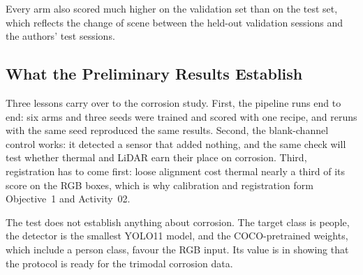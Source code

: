 Every arm also scored much higher on the validation set than on the test set,
which reflects the change of scene between the held-out validation sessions and
the authors' test sessions.

\subsection{What the Preliminary Results Establish}

Three lessons carry over to the corrosion study. First, the pipeline runs end to
end: six arms and three seeds were trained and scored with one recipe, and
reruns with the same seed reproduced the same results. Second, the blank-channel
control works: it detected a sensor that added nothing, and the same check will
test whether thermal and LiDAR earn their place on corrosion. Third,
registration has to come first: loose alignment cost thermal nearly a third of
its score on the RGB boxes, which is why calibration and registration form
Objective~1 and Activity~02.

The test does not establish anything about corrosion. The target class is people,
the detector is the smallest YOLO11 model, and the COCO-pretrained weights, which
include a person class, favour the RGB input. Its value is in showing that the
protocol is ready for the trimodal corrosion data.
